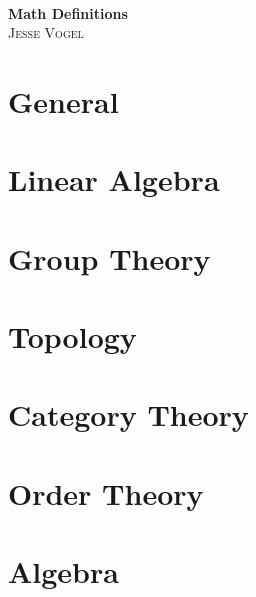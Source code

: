 \documentclass{report}
\begin{document}
\thispagestyle{empty}

\begin{center}
    \; \\ \vspace{5cm} \textbf{\Huge Math Definitions}
    \\ \vspace{2cm}
    \textsc{Jesse Vogel}
\end{center}

\newpage

{
    \renewcommand{\baselinestretch}{0.6}\normalsize
    \tableofcontents
}

\newcommand{\cat}{}

\chapter{General}
\renewcommand{\cat}{GM}


\chapter{Linear Algebra}
\renewcommand{\cat}{LA}







\chapter{Group Theory}
\renewcommand{\cat}{GT}


\chapter{Topology}
\renewcommand{\cat}{TO}


\chapter{Category Theory}
\renewcommand{\cat}{CT}




\chapter{Order Theory}
\renewcommand{\cat}{OT}


\chapter{Algebra}
\renewcommand{\cat}{AA}










\end{document}
